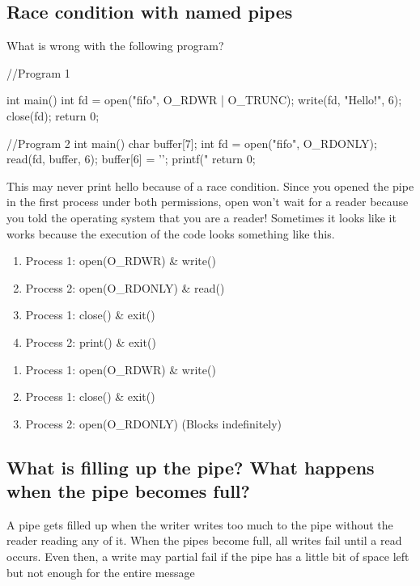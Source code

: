 \begin{enumerate}
\subsection{Race condition with named pipes}

What is wrong with the following program?

\begin{code}[language=C]
//Program 1

int main(){
    int fd = open("fifo", O_RDWR | O_TRUNC);
    write(fd, "Hello!", 6);
    close(fd);
    return 0;
}

//Program 2
int main() {
    char buffer[7];
    int fd = open("fifo", O_RDONLY);
    read(fd, buffer, 6);
    buffer[6] = '\0';
    printf("%
    return 0;
}
\end{code}

This may never print hello because of a race condition. Since you opened the pipe in the first process under both permissions, open won't wait for a reader because you told the operating system that you are a reader! Sometimes it looks like it works because the execution of the code looks something like this.

\begin{enumerate}
\item Process 1: open(O\_RDWR) \& write()
\item Process 2: open(O\_RDONLY) \& read()
\item Process 1: close() \& exit()
\item Process 2: print() \& exit()
\end{enumerate}

\begin{enumerate}
\item Process 1: open(O\_RDWR) \& write()
\item Process 1: close() \& exit()
\item Process 2: open(O\_RDONLY) (Blocks indefinitely) 
\end{enumerate}

\subsection{What is filling up the pipe? What happens when the pipe
becomes
full?}\label{what-is-filling-up-the-pipe-what-happens-when-the-pipe-becomes-full}
 A pipe gets filled up when the writer writes too much to the pipe without the reader reading any of it. When the pipes become full, all writes fail until a read occurs. Even then, a write may partial fail if the pipe has a little bit of space left but not enough for the entire message 


\end{enumerate}
